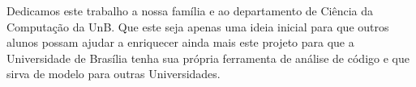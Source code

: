 Dedicamos este trabalho a nossa família e ao departamento de Ciência da Computação da UnB. Que este seja apenas uma ideia inicial para que outros alunos possam ajudar a enriquecer ainda mais este projeto para que a Universidade de Brasília tenha sua própria ferramenta de análise de código e que sirva de modelo para outras Universidades.
